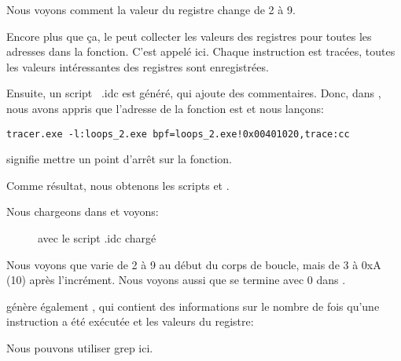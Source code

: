 

Nous voyons comment la valeur du registre \ESI change de 2 à 9.

Encore plus que ça, le \tracer peut collecter les valeurs des registres pour toutes
les adresses dans la fonction. C'est appelé  ici. Chaque instruction est
tracées, toutes les valeurs intéressantes des registres sont enregistrées.

Ensuite, un script \IDA\ .idc est généré, qui ajoute des commentaires.
Donc, dans \IDA, nous avons appris que l'adresse de la fonction \main est 
et nous lançons:

\begin{lstlisting}
tracer.exe -l:loops_2.exe bpf=loops_2.exe!0x00401020,trace:cc
\end{lstlisting}

 signifie mettre un point d'arrêt sur la fonction.

Comme résultat, nous obtenons les scripts  et .

\clearpage
Nous chargeons  dans \IDA et voyons:

\begin{figure}[H]
\centering
{}
\caption{\IDA avec le script .idc chargé}
\label{fig:loops_IDA_tracer}
\end{figure}

Nous voyons que \ESI varie de 2 à 9 au début du corps de boucle, mais de 3 à
0xA (10) après l'incrément.
Nous voyons aussi que \main se termine avec 0 dans \EAX.

\tracer génère également , qui contient des informations sur
le nombre de fois qu'une instruction a été exécutée et les valeurs du registre:


\myindex{\GrepUsage}
Nous pouvons utiliser grep ici.

